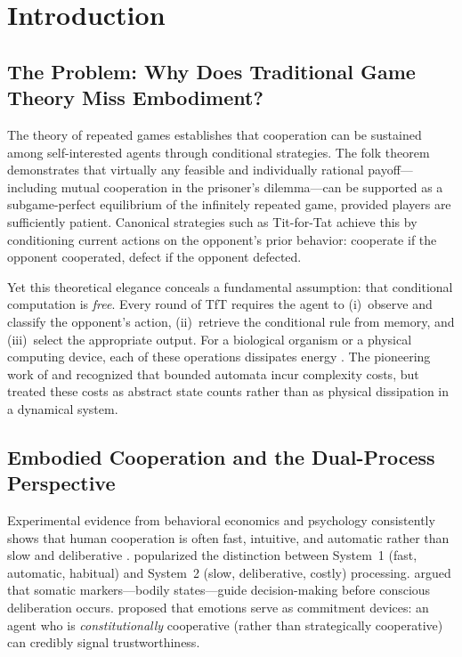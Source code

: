 \documentclass[11pt,a4paper]{article}
\theoremstyle{definition}
\begin{document}
\newpage


\section{Introduction}
\label{sec:introduction}

\subsection{The Problem: Why Does Traditional Game Theory Miss Embodiment?}

The theory of repeated games establishes that cooperation can be sustained among
self-interested agents through conditional strategies.  The folk theorem
\citep{friedman1971, fudenberg1986} demonstrates that virtually any feasible and
individually rational payoff---including mutual cooperation in the prisoner's
dilemma---can be supported as a subgame-perfect equilibrium of the infinitely
repeated game, provided players are sufficiently patient.  Canonical strategies
such as Tit-for-Tat \citep{axelrod1984} achieve this by conditioning current
actions on the opponent's prior behavior: cooperate if the opponent cooperated,
defect if the opponent defected.

Yet this theoretical elegance conceals a fundamental assumption: that conditional
computation is \emph{free}.  Every round of TfT requires the agent to (i)~observe
and classify the opponent's action, (ii)~retrieve the conditional rule from memory,
and (iii)~select the appropriate output.  For a biological organism or a physical
computing device, each of these operations dissipates energy
\citep{landauer1961, attwell2001, wolpert2019}.  The pioneering work of
\citet{rubinstein1986} and \citet{abreurubinstein1988} recognized that bounded
automata incur complexity costs, but treated these costs as abstract state counts
rather than as physical dissipation in a dynamical system.

\subsection{Embodied Cooperation and the Dual-Process Perspective}

Experimental evidence from behavioral economics and psychology consistently shows
that human cooperation is often fast, intuitive, and automatic rather than slow
and deliberative \citep{rand2012, rubinstein2007, bear2016}.
\citet{kahneman2011} popularized the distinction between System~1 (fast, automatic,
habitual) and System~2 (slow, deliberative, costly) processing.
\citet{damasio1994} argued that somatic markers---bodily states---guide decision-making
before conscious deliberation occurs.  \citet{frank1988} proposed that emotions serve
as commitment devices: an agent who is \emph{constitutionally} cooperative (rather than
strategically cooperative) can credibly signal trustworthiness.
\end{document}
